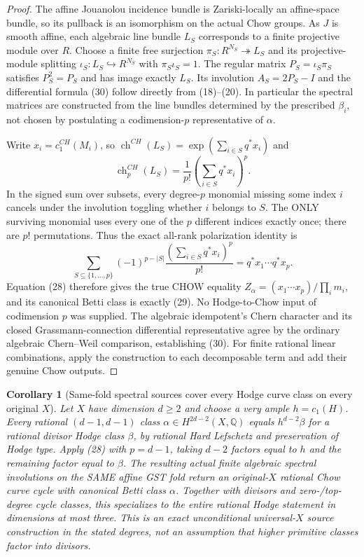 \documentclass[11pt]{article}
\newtheorem{corollary}[theorem]{Corollary}
\begin{document}
\begin{proof}
The affine Jouanolou incidence bundle is Zariski-locally an
affine-space bundle, so its pullback is an isomorphism on the
actual Chow groups. As $J$ is smooth affine, each algebraic line
bundle $L_S$ corresponds to a finite projective module over $R$.
Choose a finite free surjection $\pi_S:R^{N_S}\twoheadrightarrow L_S$
and its projective-module splitting
$\iota_S:L_S\hookrightarrow R^{N_S}$ with
$\pi_S\iota_S=1$. The regular matrix
$P_S=\iota_S\pi_S$ satisfies $P_S^2=P_S$ and has
image exactly $L_S$. Its involution $A_S=2P_S-I$
and the differential formula (30) follow directly from (18)--(20).
In particular the spectral matrices are constructed from the
line bundles determined by the prescribed $\beta_i$, not chosen
by postulating a codimension-$p$ representative of $\alpha$.

Write $x_i=c_1^{CH}(M_i)$, so
$\operatorname{ch}^{CH}(L_S)
 =\exp(\sum_{i\in S}q^*x_i)$ and
\[
 \operatorname{ch}^{CH}_p(L_S)
   =\frac1{p!}\left(\sum_{i\in S}q^*x_i\right)^p.
\]
In the signed sum over subsets, every degree-$p$ monomial
missing some index $i$ cancels under the involution toggling
whether $i$ belongs to $S$.
The ONLY surviving monomial uses every one of the $p$
different indices exactly once; there are $p!$ permutations.
Thus the exact all-rank polarization identity is
\[
 \boxed{\displaystyle
 \sum_{S\subseteq\{1,\ldots,p\}}
   (-1)^{p-|S|}
    \frac{(\sum_{i\in S}q^*x_i)^p}{p!}
      =q^*x_1\cdots q^*x_p.}                                \tag{31}
\]
Equation (28) therefore gives the true CHOW equality
$Z_\alpha=(x_1\cdots x_p)/\prod_i m_i$, and its
canonical Betti class is exactly (29).
No Hodge-to-Chow input of codimension $p$ was supplied.
The algebraic idempotent's Chern character and its closed
Grassmann-connection differential representative agree by
the ordinary algebraic Chern--Weil comparison, establishing (30).
For finite rational linear combinations, apply the construction
to each decomposable term and add their genuine Chow outputs.
\end{proof}

\begin{corollary}[Same-fold spectral sources cover every Hodge curve class on every original $X$]
Let $X$ have dimension $d\ge2$ and choose a very ample
$h=c_1(H)$. Every rational $(d-1,d-1)$ class
$\alpha\in H^{2d-2}(X,\mathbb Q)$ equals
$h^{d-2}\beta$ for a rational divisor Hodge class
$\beta$, by rational Hard Lefschetz and preservation of Hodge
type. Apply (28) with $p=d-1$, taking $d-2$ factors
equal to $h$ and the remaining factor equal to $\beta$.
The resulting \emph{actual finite algebraic spectral involutions}
on the SAME affine GST fold return an original-$X$
rational Chow curve cycle with canonical Betti class $\alpha$.
Together with divisors and zero-/top-degree cycle classes,
this specializes to the entire rational Hodge statement in
dimensions at most three. This is an exact unconditional
universal-$X$ source construction in the stated degrees,
not an assumption that higher primitive classes factor into divisors.
\end{corollary}
\end{document}
